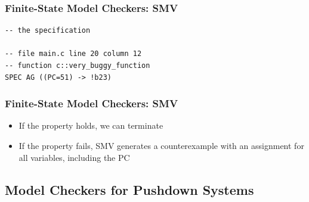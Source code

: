 
\begin{frame}[fragile]
\frametitle{Finite-State Model Checkers: SMV}


\begin{lstlisting}[basicstyle=\footnotesize,morekeywords={SPEC,AG}]
-- the specification

-- file main.c line 20 column 12
-- function c::very_buggy_function
SPEC AG ((PC=51) -> !b23)
\end{lstlisting}

\end{frame}


\begin{frame}
\frametitle{Finite-State Model Checkers: SMV}

\begin{itemize}
\item If the property holds, we can terminate
\vfill

\item If the property fails, SMV generates a
{\color{ta3chameleon}counterexample}
with an assignment for all variables, including the PC

\end{itemize}

\end{frame}


\subsection{Model Checkers for Pushdown Systems}

